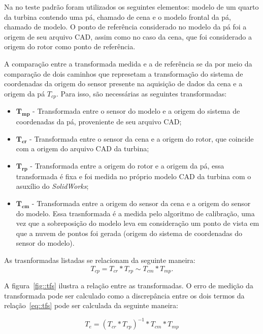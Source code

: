 Na no teste padrão foram utilizados os seguintes elementos: modelo de um quarto
da turbina contendo uma pá, chamado de cena e o modelo frontal da pá, chamado de
modelo. O ponto de referência considerado no modelo da pá foi a origem de seu
arquivo CAD, assim como no caso da cena, que foi considerado a origem do rotor
como ponto de referência.

A comparação entre a transformada medida e a de referência se da por meio da
comparação de dois caminhos que represetam a transformação do sistema de
coordenadas da origem do sensor presente na aquisição de dados da cena e a
origem da pá $T_{cp}$.  Para isso, são necessárias as seguintes transformadas:

\begin{itemize}
  \item $\mathbf{T_{mp}}$ - Transformada entre o sensor do modelo e a
  origem do sistema de coordenadas da pá, proveniente de seu arquivo CAD;
  \item $\mathbf{T_{cr}}$ - Transformada entre o sensor da cena e a origem do
  rotor, que coincide com a origem do arquivo CAD da turbina;
  \item $\mathbf{T_{rp}}$ - Transformada entre a origem do rotor e a origem da
  pá, essa transformada é fixa e foi medida no próprio modelo CAD da turbina com
  o asuxílio do \textit{SolidWorks};
  \item $\mathbf{T_{cm}}$ - Transformada entre a origem do sensor da cena e a
  origem do sensor do modelo. Essa trasnformada é a medida pelo algoritmo de
  calibração, uma vez que a sobreposição do modelo leva em consideração um ponto
  de vista em que a nuvem de pontos foi gerada (origem do sistema de
  coordenadas do sensor do modelo).
\end{itemize}

As trasnformadas listadas se relacionam da seguinte maneira:
\begin{equation}
T_{cp} = T_{cr}*T_{rp} \sim T_{cm}*T_{mp}.
\label{eq::tfs}
\end{equation}


A figura~\ref{fig::tfs} ilustra a relação entre as transformadas. O erro de
medição da transformada pode ser calculado como a discrepância entre os dois
termos da relação~\ref{eq::tfs} pode ser calculada da seguinte maneira:

$$T_e = (T_{cr}*T_{rp})^{-1}*T_{cm}*T_{mp}$$

